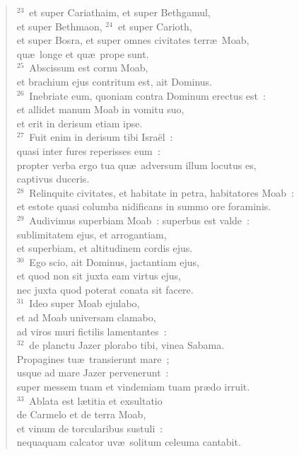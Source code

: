 \begin{verse}
${}^{23}$~et super Cariathaim, et super Bethgamul,\\ et super Bethmaon,
${}^{24}$~et super Carioth,\\ et super Bosra, et super omnes civitates terr\ae\ Moab,\\ qu\ae\ longe et qu\ae\ prope sunt.\\
${}^{25}$~Abscissum est cornu Moab,\\ et brachium ejus contritum est, ait Dominus.\\
${}^{26}$~Inebriate eum, quoniam contra Dominum erectus est~:\\ et allidet manum Moab in vomitu suo,\\ et erit in derisum etiam ipse.\\
${}^{27}$~Fuit enim in derisum tibi Isra\"el~:\\ quasi inter fures reperisses eum~:\\ propter verba ergo tua qu\ae\ adversum illum locutus es,\\ captivus duceris.\\
${}^{28}$~Relinquite civitates, et habitate in petra, habitatores Moab~:\\ et estote quasi columba nidificans in summo ore foraminis.\\
${}^{29}$~Audivimus superbiam Moab~: superbus est valde~:\\ sublimitatem ejus, et arrogantiam,\\ et superbiam, et altitudinem cordis ejus.\\
${}^{30}$~Ego scio, ait Dominus, jactantiam ejus,\\ et quod non sit juxta eam virtus ejus,\\ nec juxta quod poterat conata sit facere.\\
${}^{31}$~Ideo super Moab ejulabo,\\ et ad Moab universam clamabo,\\ ad viros muri fictilis lamentantes~:\\
${}^{32}$~de planctu Jazer plorabo tibi, vinea Sabama.\\ Propagines tu\ae\ transierunt mare~;\\ usque ad mare Jazer pervenerunt~:\\ super messem tuam et vindemiam tuam pr\ae do irruit.\\
${}^{33}$~Ablata est l\ae titia et exsultatio\\ de Carmelo et de terra Moab,\\ et vinum de torcularibus sustuli~:\\ nequaquam calcator uv\ae\ solitum celeuma cantabit.\\

\end{verse}
